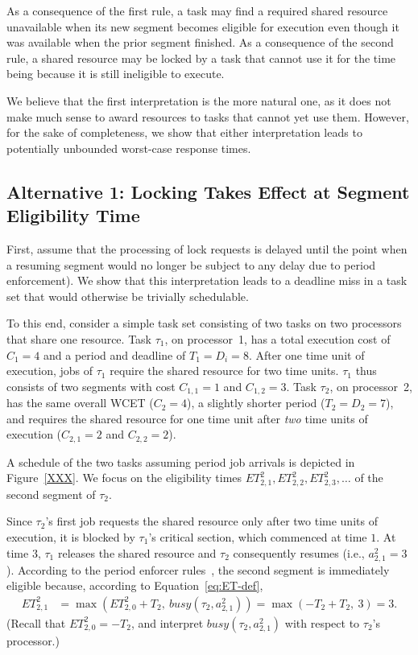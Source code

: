 As a consequence of the first rule, a task may find a required shared resource unavailable when its new segment becomes eligible for execution even though it was available when the prior segment finished.  As a consequence of the second rule, a shared resource may be locked by a task that cannot use it for the time being because it is still ineligible to execute.

We believe that the first interpretation is the more natural one, as it does not make much sense to award resources to tasks that cannot yet use them. However, for the sake of completeness, we show that either interpretation leads to potentially unbounded worst-case response times.

\subsection{Alternative 1: Locking Takes Effect at Segment Eligibility Time}
First, assume that the processing of lock requests is delayed until the point when a resuming segment would no longer be subject to any delay due to period enforcement). We show that this interpretation leads to a deadline miss in a task set that would otherwise be trivially schedulable.

To this end, consider a simple task set consisting of two tasks on two processors that share one resource. Task $\tau_1$, on processor~1, has a total execution cost of $C_1 = 4$ and a period and deadline of $T_1 = D_i = 8$. After one time unit of execution, jobs of $\tau_1$ require the shared resource for two time units. $\tau_1$ thus consists of two segments with cost $C_{1,1} = 1$ and $C_{1,2} = 3$. Task $\tau_2$, on processor~2, has the same overall WCET ($C_2 = 4$), a slightly shorter period ($T_2 = D_2 = 7$), and requires the shared resource for one time unit after \emph{two} time units of execution ($C_{2,1} = 2$ and $C_{2,2} = 2$).

A schedule of the two tasks assuming period job arrivals is depicted in Figure~\ref{XXX}. We focus on the eligibility times $ET_{2,1}^2,ET_{2,2}^2,ET_{2,3}^2,\ldots$ of the second segment of $\tau_2$.

Since $\tau_2$'s first job requests the shared resource only after two time units of execution, it is blocked by $\tau_1$'s critical section, which commenced at time $1$. At time $3$, $\tau_1$ releases the shared resource and $\tau_2$ consequently resumes (i.e., $a^2_{2,1} = 3$). According to the period enforcer rules~\cite{Raj:suspension1991}, the second segment is immediately eligible because, according to Equation~\ref{eq:ET-def},
\begin{align*}
	ET_{2,1}^2 & = \max\left(ET_{2,0}^2 + T_2,\ \mathit{busy}(\tau_2, a^2_{2,1})\right) =\max(-T_2 + T_2,\ 3) = 3.
\end{align*}
(Recall that $ET_{2,0}^2 = -T_2$, and interpret $\mathit{busy}(\tau_2, a^2_{2,1})$ with respect to $\tau_2$'s processor.)


